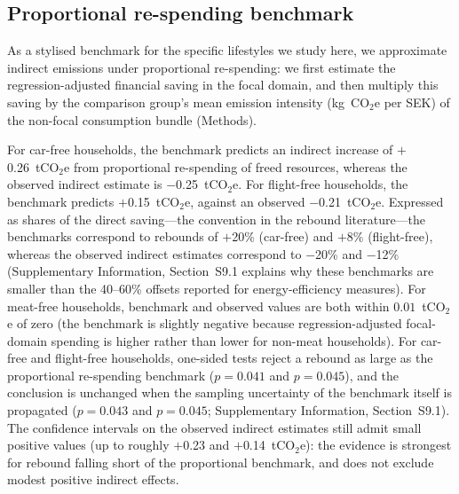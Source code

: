 \documentclass[sn-nature]{sn-jnl}
\begin{document}
\subsection{Proportional re-spending benchmark}
As a stylised benchmark for the specific lifestyles we study here, we approximate indirect emissions under proportional re-spending: we first estimate the regression-adjusted financial saving in the focal domain, and then multiply this saving by the comparison group's mean emission intensity (kg~CO$_2$e per SEK) of the non-focal consumption bundle (Methods). 

For car-free households, the benchmark predicts an indirect increase of $+$0.26~tCO$_2$e from proportional re-spending of freed resources, whereas the observed indirect estimate is $-$0.25~tCO$_2$e. For flight-free households, the benchmark predicts $+$0.15~tCO$_2$e, against an observed $-$0.21~tCO$_2$e. Expressed as shares of the direct saving---the convention in the rebound literature---the benchmarks correspond to rebounds of $+$20\% (car-free) and $+$8\% (flight-free), whereas the observed indirect estimates correspond to $-$20\% and $-$12\% (Supplementary Information, Section~S9.1 explains why these benchmarks are smaller than the 40--60\% offsets reported for energy-efficiency measures). For meat-free households, benchmark and observed values are both within $0.01$~tCO$_2$e of zero (the benchmark is slightly negative because regression-adjusted focal-domain spending is higher rather than lower for non-meat households). For car-free and flight-free households, one-sided tests reject a rebound as large as the proportional re-spending benchmark ($p = 0.041$ and $p = 0.045$), and the conclusion is unchanged when the sampling uncertainty of the benchmark itself is propagated ($p = 0.043$ and $p = 0.045$; Supplementary Information, Section~S9.1). The confidence intervals on the observed indirect estimates still admit small positive values (up to roughly $+$0.23 and $+$0.14~tCO$_2$e): the evidence is strongest for rebound falling short of the proportional benchmark, and does not exclude modest positive indirect effects.
\end{document}
